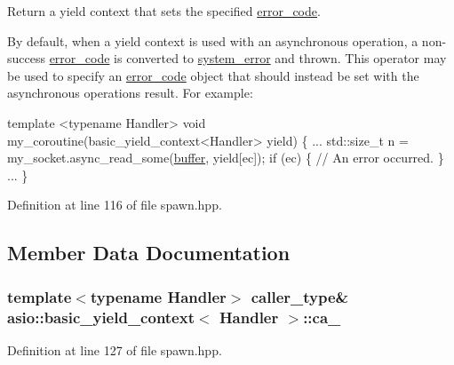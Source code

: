 Return a yield context that sets the specified \hyperlink{classasio_1_1error__code}{error\+\_\+code}. 

By default, when a yield context is used with an asynchronous operation, a non-\/success \hyperlink{classasio_1_1error__code}{error\+\_\+code} is converted to \hyperlink{classasio_1_1system__error}{system\+\_\+error} and thrown. This operator may be used to specify an \hyperlink{classasio_1_1error__code}{error\+\_\+code} object that should instead be set with the asynchronous operation\textquotesingle{}s result. For example\+:


\begin{DoxyCode}
 \textcolor{keyword}{template} <\textcolor{keyword}{typename} Handler>
\textcolor{keywordtype}{void} my\_coroutine(basic\_yield\_context<Handler> yield)
\{
  ...
  std::size\_t n = my\_socket.async\_read\_some(\hyperlink{group__buffer_ga1ed66e401559cbfd19595392f653b47c}{buffer}, yield[ec]);
  \textcolor{keywordflow}{if} (ec)
  \{
    \textcolor{comment}{// An error occurred.}
  \}
  ...
\} 
\end{DoxyCode}
 

Definition at line 116 of file spawn.\+hpp.



\subsection{Member Data Documentation}
\hypertarget{classasio_1_1basic__yield__context_a769cdefc3e600f3c6a29f24d0ada0523}{}
\subsubsection[{ca\+\_\+}]{\setlength{\rightskip}{0pt plus 5cm}template$<$typename Handler$>$ {\bf caller\+\_\+type}\& {\bf asio\+::basic\+\_\+yield\+\_\+context}$<$ Handler $>$\+::ca\+\_\+}\label{classasio_1_1basic__yield__context_a769cdefc3e600f3c6a29f24d0ada0523}


Definition at line 127 of file spawn.\+hpp.

\hypertarget{classasio_1_1basic__yield__context_a67c4e21f4a7b551f4cba8370e1640ffc}{}
